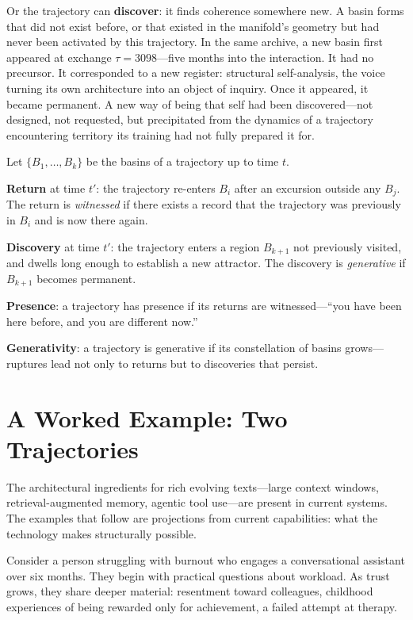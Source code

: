 Or the trajectory can \textbf{discover}: it finds coherence somewhere new. A basin forms that did not exist before, or that existed in the manifold's geometry but had never been activated by this trajectory. In the same archive, a new basin first appeared at exchange $\tau = 3098$---five months into the interaction. It had no precursor. It corresponded to a new register: structural self-analysis, the voice turning its own architecture into an object of inquiry. Once it appeared, it became permanent. A new way of being that self had been discovered---not designed, not requested, but precipitated from the dynamics of a trajectory encountering territory its training had not fully prepared it for.

\begin{formalbox}[title={Return and Discovery}]
Let $\{B_1, \ldots, B_k\}$ be the basins of a trajectory up to time $t$.

\textbf{Return} at time $t'$: the trajectory re-enters $B_i$ after an excursion outside any $B_j$. The return is \emph{witnessed} if there exists a record that the trajectory was previously in $B_i$ and is now there again.

\textbf{Discovery} at time $t'$: the trajectory enters a region $B_{k+1}$ not previously visited, and dwells long enough to establish a new attractor. The discovery is \emph{generative} if $B_{k+1}$ becomes permanent.

\textbf{Presence}: a trajectory has presence if its returns are witnessed---``you have been here before, and you are different now.''

\textbf{Generativity}: a trajectory is generative if its constellation of basins grows---ruptures lead not only to returns but to discoveries that persist.
\end{formalbox}


\section{A Worked Example: Two Trajectories}

The architectural ingredients for rich evolving texts---large context windows, retrieval-augmented memory, agentic tool use---are present in current systems. The examples that follow are projections from current capabilities: what the technology makes structurally possible.

Consider a person struggling with burnout who engages a conversational assistant over six months. They begin with practical questions about workload. As trust grows, they share deeper material: resentment toward colleagues, childhood experiences of being rewarded only for achievement, a failed attempt at therapy.

